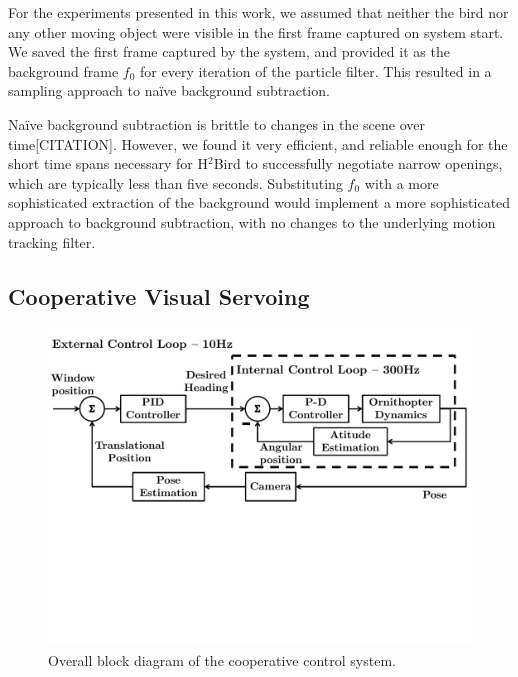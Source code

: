 \documentclass{aamas2013}
\begin{document}
For the experiments presented in this work, we assumed that neither the bird 
nor any other moving object were visible in the first frame captured on system 
start. We saved the first frame captured by the system, and provided it as 
the background frame $f_0$ for every iteration of the particle filter. This 
resulted in a sampling approach to na\"{i}ve background subtraction. 

Na\"{i}ve background subtraction is brittle to changes in the scene over 
time[CITATION]. However, we found it very efficient, and reliable enough for the 
short time spans necessary for H$^2$Bird to successfully negotiate narrow 
openings, which are typically less than five seconds. Substituting $f_0$ 
with a more sophisticated extraction of the background would implement a 
more sophisticated approach to background subtraction, with no changes to 
the underlying motion tracking filter.

\subsection{Cooperative Visual Servoing}
\label{sec:visual_servoing_concept}

\begin{figure}[tb]
\centering
\includegraphics[width=\linewidth]{figures/block_diagrams.pdf}
\caption{Overall block diagram of the cooperative control system.}
\label{fig:block_diagram}
\end{figure}
\end{document}
